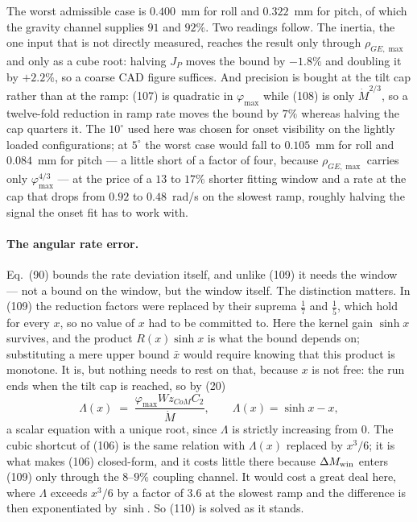 \documentclass[10pt]{article}
\newcommand{\Wz}{W\!z_{CoM}}
\begin{document}
The worst admissible case is $0.400$~mm for roll and $0.322$~mm for
pitch, of which the gravity channel supplies $91$ and $92\%$. Two
readings follow. The inertia, the one input that is not directly
measured, reaches the result only through $\rho_{GE,\max}$ and only as a
cube root: halving $J_P$ moves the bound by $-1.8\%$ and doubling it by
$+2.2\%$, so a coarse CAD figure suffices. And precision is bought at
the tilt cap rather than at the ramp: (107) is quadratic in
$\varphi_{\max}$ while (108) is only $\dot M^{2/3}$, so a twelve-fold
reduction in ramp rate moves the bound by $7\%$ whereas halving the cap
quarters it. The $10^\circ$ used here was chosen for onset visibility
on the lightly loaded configurations; at $5^\circ$ the worst case would
fall to $0.105$~mm for roll and $0.084$~mm for pitch --- a little short
of a factor of four, because $\rho_{GE,\max}$ carries only
$\varphi_{\max}^{4/3}$ --- at the price of a $13$ to $17\%$ shorter
fitting window and a rate at the cap that drops from $0.92$ to
$0.48$~rad/s on the slowest ramp, roughly halving the signal the onset
fit has to work with.

\paragraph{The angular rate error.}
Eq.~(90) bounds the rate deviation itself, and unlike (109) it needs the
window --- not a bound on the window, but the window itself. The
distinction matters. In (109) the reduction factors were replaced by
their suprema $\tfrac17$ and $\tfrac15$, which hold for every $x$, so no
value of $x$ had to be committed to. Here the kernel gain $\sinh x$
survives, and the product $R(x)\sinh x$ is what the bound depends on;
substituting a mere upper bound $\bar x$ would require knowing that this
product is monotone. It is, but nothing needs to rest on that, because
$x$ is not free: the run ends when the tilt cap is reached, so by (20)
\begin{equation}
  \Lambda(x) \;=\; \frac{\varphi_{\max}\Wz C_2}{\dot M},
  \qquad \Lambda(x) = \sinh x - x ,
  \tag{110}
\end{equation}
a scalar equation with a unique root, since $\Lambda$ is strictly
increasing from $0$. The cubic shortcut of (106) is the same relation
with $\Lambda(x)$ replaced by $x^3/6$; it is what makes (106)
closed-form, and it costs little there because $\Delta M_{\rm win}$
enters (109) only through the $8$--$9\%$ coupling channel. It would cost
a great deal here, where $\Lambda$ exceeds $x^3/6$ by a factor of $3.6$
at the slowest ramp and the difference is then exponentiated by $\sinh$.
So (110) is solved as it stands.
\end{document}
